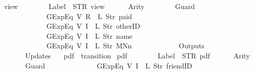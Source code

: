 \begin{isabellebody}
{\isachardoublequoteopen}view{}\ {\isasymequiv}\ {\isasymlparr}\isanewline
\ \ \ \ \ \ Label\ {\isacharequal}\ STR\ {\isacharprime}{\isacharprime}view{\isacharprime}{\isacharprime}{\isacharcomma}\isanewline
\ \ \ \ \ \ Arity\ {\isacharequal}\ {}{\isacharcomma}\isanewline
\ \ \ \ \ \ Guard\ {\isacharequal}\ {\isacharbrackleft}\isanewline
\ \ \ \ \ \ \ \ \ \ \ \ GExp{\isachardot}Eq\ {\isacharparenleft}V\ {\isacharparenleft}R\ {}{\isacharparenright}{\isacharparenright}\ {\isacharparenleft}L\ {\isacharparenleft}Str\ {\isacharprime}{\isacharprime}paid{\isacharprime}{\isacharprime}{\isacharparenright}{\isacharparenright}{\isacharcomma}\isanewline
\ \ \ \ \ \ \ \ \ \ \ \ GExp{\isachardot}Eq\ {\isacharparenleft}V\ {\isacharparenleft}I\ {}{\isacharparenright}{\isacharparenright}\ {\isacharparenleft}L\ {\isacharparenleft}Str\ {\isacharprime}{\isacharprime}otherID{\isacharprime}{\isacharprime}{\isacharparenright}{\isacharparenright}{\isacharcomma}\isanewline
\ \ \ \ \ \ \ \ \ \ \ \ GExp{\isachardot}Eq\ {\isacharparenleft}V\ {\isacharparenleft}I\ {}{\isacharparenright}{\isacharparenright}\ {\isacharparenleft}L\ {\isacharparenleft}Str\ {\isacharprime}{\isacharprime}name{\isacharprime}{\isacharprime}{\isacharparenright}{\isacharparenright}{\isacharcomma}\isanewline
\ \ \ \ \ \ \ \ \ \ \ \ GExp{\isachardot}Eq\ {\isacharparenleft}V\ {\isacharparenleft}I\ {}{\isacharparenright}{\isacharparenright}\ {\isacharparenleft}L\ {\isacharparenleft}Str\ {\isacharprime}{\isacharprime}MNn{}{\isacharprime}{\isacharprime}{\isacharparenright}{\isacharparenright}\isanewline
\ \ \ \ \ \ {\isacharbrackright}{\isacharcomma}\isanewline
\ \ \ \ \ \ Outputs\ {\isacharequal}\ {\isacharbrackleft}{\isacharbrackright}{\isacharcomma}\isanewline
\ \ \ \ \ \ Updates\ {\isacharequal}\ {\isacharbrackleft}{\isacharbrackright}\isanewline
{\isasymrparr}{\isachardoublequoteclose}\isanewline
\isanewline
{}\isamarkupfalse%
\ {\isachardoublequoteopen}pdf{\isachardoublequoteclose}\ {\isacharcolon}{\isacharcolon}\ {\isachardoublequoteopen}transition{\isachardoublequoteclose}\ \isanewline
{\isachardoublequoteopen}pdf\ {\isasymequiv}\ {\isasymlparr}\isanewline
\ \ \ \ \ \ Label\ {\isacharequal}\ STR\ {\isacharprime}{\isacharprime}pdf{\isacharprime}{\isacharprime}{\isacharcomma}\isanewline
\ \ \ \ \ \ Arity\ {\isacharequal}\ {}{\isacharcomma}\isanewline
\ \ \ \ \ \ Guard\ {\isacharequal}\ {\isacharbrackleft}\isanewline
\ \ \ \ \ \ \ \ \ \ \ \ GExp{\isachardot}Eq\ {\isacharparenleft}V\ {\isacharparenleft}I\ {}{\isacharparenright}{\isacharparenright}\ {\isacharparenleft}L\ {\isacharparenleft}Str\ {\isacharprime}{\isacharprime}friendID{\isacharprime}{\isacharprime}{\isacharparenright}{\isacharparenright}{\isacharcomma}\isanewline

\end{isabellebody}
